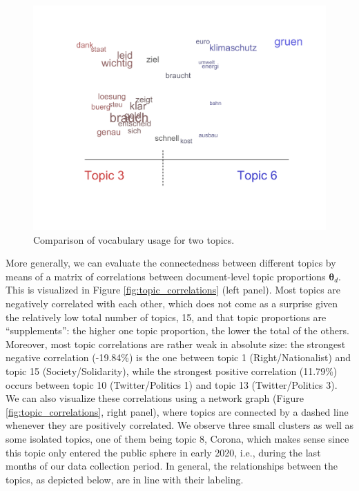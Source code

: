 \begin{figure}[h!]
  \centering
  \captionsetup{justification=centering,margin=2cm}
  \includegraphics[scale = 0.5]{../plots/4_3/vocabulary_comparison.pdf}
  \caption{Comparison of vocabulary usage for two topics.}
  \label{fig:vocabulary_comparison}
\end{figure}

More generally, we can evaluate the connectedness between different topics by means of a matrix of correlations between document-level topic proportions $\boldsymbol{\theta}_d$. This is visualized in Figure \ref{fig:topic_correlations} (left panel). Most topics are negatively correlated with each other, which does not come as a surprise given the relatively low total number of topics, 15, and that topic proportions are “supplements”: the higher one topic proportion, the lower the total of the others. Moreover, most topic correlations are rather weak in absolute size: the strongest negative correlation (-19.84\%) is the one between topic 1 (Right/Nationalist) and topic 15 (Society/Solidarity), while the strongest positive correlation (11.79\%) occurs between topic 10 (Twitter/Politics 1) and topic 13 (Twitter/Politics 3). We can also visualize these correlations using a network graph (Figure \ref{fig:topic_correlations}, right panel), where topics are connected by a dashed line whenever they are positively correlated. We observe three small clusters as well as some isolated topics, one of them being topic 8, Corona, which makes sense since this topic only entered the public sphere in early 2020, i.e., during the last months of our data collection period. In general, the relationships between the topics, as depicted below, are in line with their labeling.

